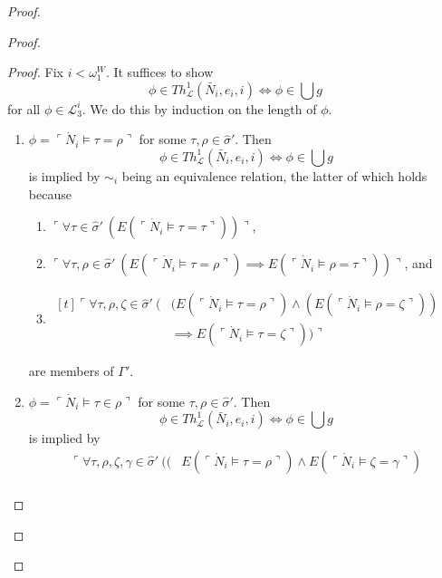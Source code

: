 \documentclass[12pt]{article}
\numberwithin{equation}{section}
\begin{document}
\begin{proof}
\begin{proof}
\begin{proof}
Fix $i < \omega_1^W$. It suffices to show 
\begin{equation*}
    \phi \in Th^{1}_{\mathcal{L}}(\bar{N}_i, e_i, i) \iff \phi \in \bigcup g
\end{equation*}
for all $\phi \in \mathcal{L}^i_3$. We do this by induction on the length of $\phi$. 

\begin{enumerate}[label=Case \arabic*:, leftmargin=50pt]
    \item $\phi = \ulcorner \dot{N}_i \models \tau = \rho \urcorner$ for some $\tau, \rho \in \hat{\sigma}'$. Then 
    \begin{equation*}
        \phi \in Th^{1}_{\mathcal{L}}(\bar{N}_i, e_i, i) \iff \phi \in \bigcup g
    \end{equation*}
    is implied by $\sim_i$ being an equivalence relation, the latter of which holds because 
    \begin{enumerate}[label=(\alph*)]
        \item $\ulcorner \forall \tau \in \hat{\sigma}' \ (E(\ulcorner \dot{N}_i \models \tau = \tau \urcorner)) \urcorner$,
        \item $\ulcorner \forall \tau, \rho \in \hat{\sigma}' \ (E(\ulcorner \dot{N}_i \models \tau = \rho \urcorner) \implies E(\ulcorner \dot{N}_i \models \rho = \tau \urcorner)) \urcorner$, and
        \item 
        \!
        $\begin{aligned}[t]\ulcorner \forall \tau, \rho, \zeta \in \hat{\sigma}' \ (&(E(\ulcorner \dot{N}_i \models \tau = \rho \urcorner) \wedge (E(\ulcorner \dot{N}_i \models \rho = \zeta \urcorner)) \\
        & \implies E(\ulcorner \dot{N}_i \models \tau = \zeta \urcorner)) \urcorner
        \end{aligned}$
    \end{enumerate}
    are members of $\Gamma'$.
    \item $\phi = \ulcorner \dot{N}_i \models \tau \in \rho \urcorner$ for some $\tau, \rho \in \hat{\sigma}'$. Then 
    \begin{equation*}
        \phi \in Th^{1}_{\mathcal{L}}(\bar{N}_i, e_i, i) \iff \phi \in \bigcup g
    \end{equation*}
    is implied by  
    \begin{align*}
        \ulcorner \forall \tau, \rho, \zeta, \gamma \in \hat{\sigma}' \ (( & E(\ulcorner \dot{N}_i \models \tau = \rho \urcorner) \wedge E(\ulcorner \dot{N}_i \models \zeta = \gamma \urcorner) \\

\end{align*}
\end{enumerate}
\end{proof}
\end{proof}
\end{proof}
\end{document}
